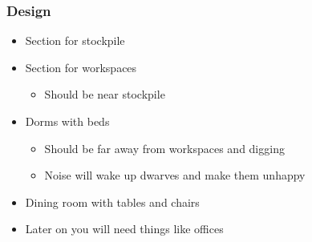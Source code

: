 \begin{frame}
\frametitle{Design}
\begin{itemize}
\item Section for stockpile
\item Section for workspaces
\begin{itemize}
	\item Should be near stockpile
\end{itemize}
\item Dorms with beds
\begin{itemize}
	\item Should be far away from workspaces and digging
	\item Noise will wake up dwarves and make them unhappy
\end{itemize}
\item Dining room with tables and chairs
\item Later on you will need things like offices
\end{itemize}
\end{frame}
